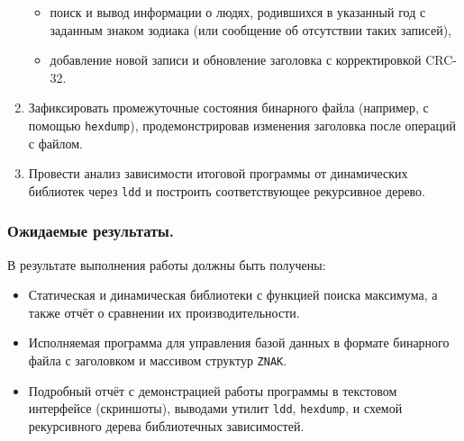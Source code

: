 \begin{enumerate}
\begin{itemize}
\item поиск и вывод информации о людях, родившихся в указанный год с заданным знаком зодиака (или сообщение об отсутствии таких записей),
\item добавление новой записи и обновление заголовка с корректировкой CRC-32.
\end{itemize}
\item Зафиксировать промежуточные состояния бинарного файла (например, с помощью \texttt{hexdump}), продемонстрировав изменения заголовка после операций с файлом.
\item Провести анализ зависимости итоговой программы от динамических библиотек через \texttt{ldd} и построить соответствующее рекурсивное дерево.
\end{enumerate}

\subsubsection*{Ожидаемые результаты.}
В результате выполнения работы должны быть получены:
\begin{itemize}
\item Статическая и динамическая библиотеки с функцией поиска максимума, а также отчёт о сравнении их производительности.
\item Исполняемая программа для управления базой данных в формате бинарного файла с заголовком и массивом структур \texttt{ZNAK}.
\item Подробный отчёт с демонстрацией работы программы в текстовом интерфейсе (скриншоты), выводами утилит \texttt{ldd}, \texttt{hexdump}, и схемой рекурсивного дерева библиотечных зависимостей.
\end{itemize}